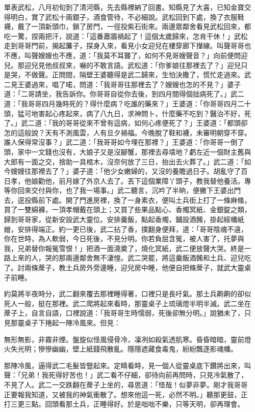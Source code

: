 \begin{showcontents}{}
單表武松，八月初旬到了清河縣，先去縣裡納了回書。知縣見了大喜，已知金寶交得明白，賞了武松十兩銀子，酒食管待，不必細說。武松回到下處，換了衣服鞋襪，戴了一頂新頭巾，鎖了房門，一徑投紫石街來。兩邊眾鄰舍看見武松回來，都吃一驚，捏兩把汗，說道：「這番蕭牆禍起了！這個太歲歸來，怎肯干休！」武松走到哥哥門前，揭起簾子，探身入來，看見小女迎兒在樓穿廊下攆線。叫聲哥哥也不應，叫聲嫂嫂也不應，道：「我莫不耳聾了，如何不見哥嫂聲音？」向前便問迎兒。那迎兒見他叔叔來，嚇的不敢言語。武松道：「你爹娘往那裡去了？」迎兒只是哭，不做聲。正問間，隔壁王婆聽得是武二歸來，生怕決撒了，慌忙走過來。武二見王婆過來，唱了喏，問道：「我哥哥往那裡去了？嫂嫂也怎的不見？」婆子道：「二哥請坐，我告訴你。你哥哥自從你去後，到四月間得個拙病死了。」武二道：「我哥哥四月幾時死的？得什麼病？吃誰的藥來？」王婆道：「你哥哥四月二十頭，猛可地害起心疼起來，病了八九日，求神問卜，什麼藥不吃到？醫治不好，死了。」武二道：「我的哥哥從來不曾有這病，如何心疼便死了？」王婆道：「都頭卻怎的這般說？天有不測風雲，人有旦夕禍福。今晚脫了鞋和襪，未審明朝穿不穿。誰人保得常沒事？」武二道：「我哥哥如今埋在那裡？」王婆道：「你哥哥一倒了頭，家中一文錢也沒有，大娘子又是沒腳蟹，那裡去尋墳地？虧左近一個財主舊與大郎有一面之交，捨助一具棺木，沒奈何放了三日，抬出去火葬了。」武二道：「如今嫂嫂往那裡去了？」婆子道：「他少女嫩婦的，又沒的養贍過日子。胡亂守了百日孝，他娘勸他，前月嫁了外京人去了。丟下這個業障丫頭子，教我替他養活。專等你回來交付與你，也了我一場事。」武二聽言，沉吟了半晌，便撇下王婆出門去，逕投縣前下處。開了門進房裡，換了一身素衣，便叫土兵街上打了一條麻絛，買了一雙綿褲，一頂孝帽戴在頭上；又買了些果品點心、香燭冥紙、金銀錠之類，歸到哥哥家，從新安設武大靈位。安排羹飯，點起香燭，鋪設酒餚，掛起經幡紙繒，安排得端正。約一更已後，武二拈了香，撲翻身便拜，道：「哥哥陰魂不遠，你在世時，為人軟弱，今日死後，不見分明。你若負屈含冤，被人害了，托夢與我，兄弟替你報冤雪恨！」把酒一面澆奠了，燒化冥紙，武二便放聲大哭。終是一路上來的人，哭的那兩邊鄰舍無不淒惶。武二哭罷，將這羹飯酒餚和土兵、迎兒吃了。討兩條蓆子，教土兵房外旁邊睡，迎兒房中睡，他便自把條蓆子，就武大靈桌子前睡。

約莫將半夜時分，武二翻來覆去那裡睡得著，口裡只是長吁氣。那土兵齁齁的卻似死人一般，挺在那裡。武二爬將起來看時，那靈桌子上琉璃燈半明半滅。武二坐在蓆子上，自言自語，口裡說道：「我哥哥生時懦弱，死後卻無分明。」說猶未了，只見那靈桌子下捲起一陣冷風來。但見：

無形無影，非霧非煙。盤旋似怪風侵骨冷，凜冽如殺氣透肌寒。昏昏暗暗，靈前燈火失光明；慘慘幽幽，壁上紙錢飛散亂。隱隱遮藏食毒鬼，紛紛飄逐影魂幡。

那陣冷風，逼得武二毛髮皆豎起來。定睛看時，見一個人從靈桌底下鑽將出來，叫聲：「兄弟！我死得好苦也！」武二看不仔細，卻待向前再問時，只見冷氣散了，不見了人。武二一交跌翻在蓆子上坐的，尋思道：「怪哉！似夢非夢。剛才我哥哥正要報我知道，又被我的神氣衝散了。想來他這一死，必然不明。」聽那更鼓，正打三更三點。回頭看那土兵，正睡得好。於是咄咄不樂，只等天明，卻再理會。


\end{showcontents}

